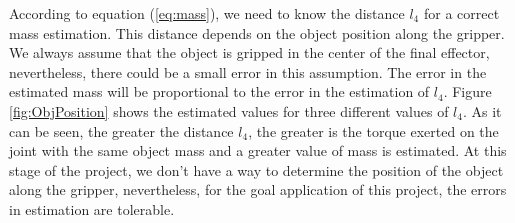 \documentclass[a4paper, 10pt]{article}
\begin{document}
According to equation (\ref{eq:mass}), we need to know the distance $l_4$ for a correct mass estimation. This distance depends on the object position along the gripper. We always assume that the object is gripped in the center of the final effector, nevertheless, there could be a small error in this assumption. The error in the estimated mass will be proportional to the error in the estimation of $l_4$. Figure \ref{fig:ObjPosition} shows the estimated values for three different values of $l_4$. As it can be seen, the greater the distance $l_4$, the greater is the torque exerted on the joint with the same object mass and a greater value of mass is estimated. At this stage of the project, we don't have a way to determine the position of the object along the gripper, nevertheless, for the goal application of this project, the errors in estimation are tolerable. 
\end{document}
